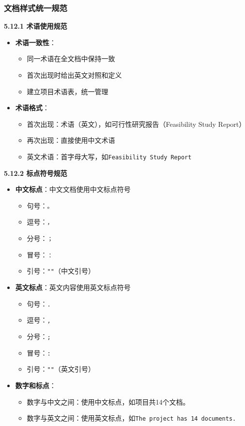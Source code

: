 \documentclass[12pt,a4paper]{article}
\numberwithin{equation}{section}  %
\begin{document}
\subsubsection{文档样式统一规范}
\textbf{5.12.1 术语使用规范}

\begin{itemize}
\item \textbf{术语一致性}：
\begin{itemize}
\item 同一术语在全文档中保持一致
\item 首次出现时给出英文对照和定义
\item 建立项目术语表，统一管理

\end{itemize}
\item \textbf{术语格式}：
\begin{itemize}
\item 首次出现：{\ttfamily 术语（英文）}，如{\ttfamily 可行性研究报告（Feasibility Study Report）}
\item 再次出现：直接使用中文术语
\item 英文术语：首字母大写，如\texttt{Feasibility Study Report}
\end{itemize}
\end{itemize}

\textbf{5.12.2 标点符号规范}

\begin{itemize}
\item \textbf{中文标点}：中文文档使用中文标点符号
\begin{itemize}
\item 句号：\texttt{。}
\item 逗号：\texttt{，}
\item 分号：\texttt{；}
\item 冒号：\texttt{：}
\item 引号：\texttt{""}（中文引号）

\end{itemize}
\item \textbf{英文标点}：英文内容使用英文标点符号
\begin{itemize}
\item 句号：\texttt{.}
\item 逗号：\texttt{,}
\item 分号：\texttt{;}
\item 冒号：\texttt{:}
\item 引号：\texttt{""}（英文引号）

\end{itemize}
\item \textbf{数字和标点}：
\begin{itemize}
\item 数字与中文之间：使用中文标点，如{\ttfamily 项目共14个文档。}
\item 数字与英文之间：使用英文标点，如\texttt{The project has 14 documents.}
\end{itemize}
\end{itemize}
\end{document}
